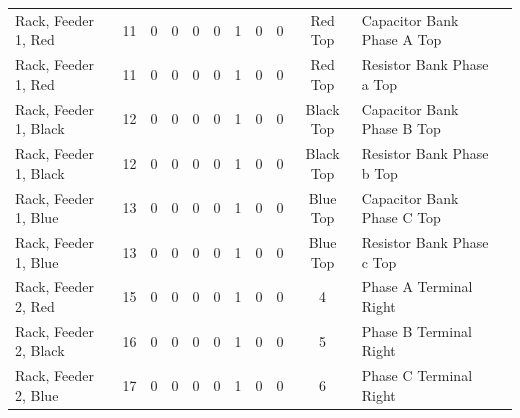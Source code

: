 \begin{table}[!htp]
{\begin{tabular}{lcccccccccll}
			Rack, Feeder 1, Red            & 11                      & 0                                           & 0                                          & 0           & 0           & 1            & 0                & 0 & Red Top                      & Capacitor Bank Phase A Top       &                \\
			Rack, Feeder 1, Red            & 11                      & 0                                           & 0                                          & 0           & 0           & 1            & 0                & 0 & Red Top                      & Resistor Bank Phase a Top        &                \\
			Rack, Feeder 1, Black          & 12                      & 0                                           & 0                                          & 0           & 0           & 1            & 0                & 0 & Black Top                    & Capacitor Bank Phase B Top       &                \\
			Rack, Feeder 1, Black          & 12                      & 0                                           & 0                                          & 0           & 0           & 1            & 0                & 0 & Black Top                    & Resistor Bank Phase b Top        &                \\
			Rack, Feeder 1, Blue           & 13                      & 0                                           & 0                                          & 0           & 0           & 1            & 0                & 0 & Blue Top                     & Capacitor Bank Phase C Top       &                \\
			Rack, Feeder 1, Blue           & 13                      & 0                                           & 0                                          & 0           & 0           & 1            & 0                & 0 & Blue Top                     & Resistor Bank Phase c Top        &                \\
			Rack, Feeder 2, Red            & 15                      & 0                                           & 0                                          & 0           & 0           & 1            & 0                & 0 & 4                            & Phase A Terminal Right           &                \\
			Rack, Feeder 2, Black          & 16                      & 0                                           & 0                                          & 0           & 0           & 1            & 0                & 0 & 5                            & Phase B Terminal Right           &                \\
			Rack, Feeder 2, Blue           & 17                      & 0                                           & 0                                          & 0           & 0           & 1            & 0                & 0 & 6                            & Phase C Terminal Right           &                \\ \bottomrule
		\end{tabular}
	}
\end{table}
